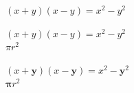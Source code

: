 \documentclass[a4paper]{article}
\begin{document}
	$(x + y)(x - y) = x^{2} - y^{2}$
	
	{\boldmath $(x + y)(x - y) = x^{2} - y^{2}$ \\ $\pi r^2$}
	
	$(x + \mathbf{y})(x - \mathbf{y}) = x^{2} - \mathbf{y}^{2}$\\
	$\mathbf{\pi} r^{2}$ %
\end{document}
